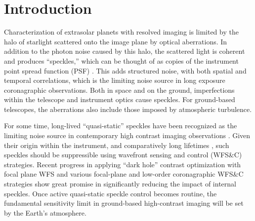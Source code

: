 \documentclass[10pt,preprint]{aastex631}
\newcommand{\mpfadd}[1]{\textcolor{avocado}{#1}}
\begin{document}
 
\section{Introduction}
Characterization of extrasolar planets with resolved imaging is limited by the halo of starlight scattered onto the image plane by optical aberrations.  In addition to the photon noise caused by this halo, the scattered light is coherent and produces ``speckles,'' which can be thought of as copies of the instrument point spread function (PSF) \citep{1995PASP..107..386M}.  This adds structured noise, with both spatial and temporal correlations, which is the limiting noise source in long exposure coronagraphic observations.    Both in space and on the ground, imperfections within the telescope and instrument optics cause speckles.   For ground-based telescopes, the aberrations also include those imposed by atmospheric turbulence.

For some time, long-lived ``quasi-static'' speckles have been recognized as the limiting noise source in contemporary high contrast imaging observations \citep[e.g.][]{2007ApJ...654..633H}.  Given their origin within the instrument, and comparatively long lifetimes \citep{2012A&A...541A.136M}, such speckles should be suppressible using wavefront sensing and control (WFS\&C) strategies.  Recent progress in applying ``dark hole'' contrast optimization with focal plane WFS \citep{2020A&A...638A.117P} and various focal-plane \citep[e.g.][]{2010A&A...509A..31G} and low-order coronagraphic WFS\&C strategies \citep[e.g.][]{2017PASP..129i5002S} show great promise in significantly reducing the impact of internal speckles.  Once active quasi-static speckle control becomes routine, the fundamental sensitivity limit in ground-based high-contrast imaging will be set by the Earth's atmosphere.

\end{document}
